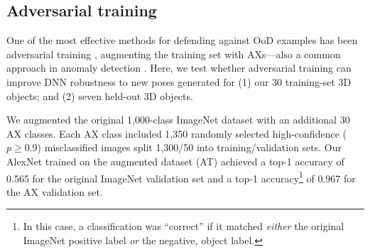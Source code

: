 \documentclass[10pt,twocolumn,letterpaper]{article}
\newcommand{\subsec}[1]{\noindent{\textbf{#1.}}}
\begin{document}

\subsection{Adversarial training}\label{sec:adversarial_training}

One of the most effective methods for defending against OoD examples has been adversarial training \cite{Goodfellow2014}, \ie augmenting the training set with AXs---also a common approach in anomaly detection \cite{chandola2009anomaly}.
Here, we test whether adversarial training can improve DNN robustness to new poses generated for (1) our 30 training-set 3D objects; and (2) seven held-out 3D objects.

%

\subsec{Training}
We augmented the original 1,000-class ImageNet dataset with an additional 30 AX classes.
Each AX class included 1,350 randomly selected high-confidence ($p \geq 0.9$) misclassified images split 1,300/50 into training/validation sets.
Our AlexNet trained on the augmented dataset (AT) achieved a top-1 accuracy of 0.565 for the original ImageNet validation set and a top-1 accuracy\footnote{In this case, a classification was ``correct'' if it matched \emph{either} the original ImageNet positive label \emph{or} the negative, object label.} of 0.967 for the AX validation set.


\end{document}
